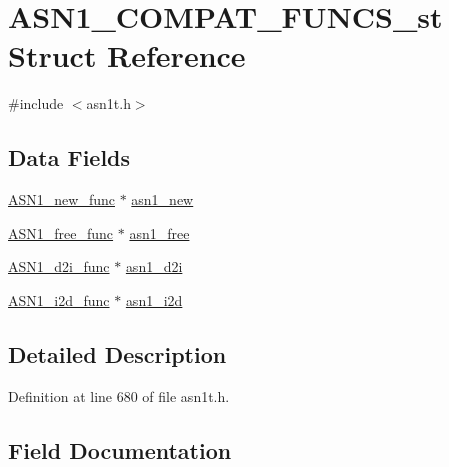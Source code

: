 \hypertarget{struct_a_s_n1___c_o_m_p_a_t___f_u_n_c_s__st}{}\section{A\+S\+N1\+\_\+\+C\+O\+M\+P\+A\+T\+\_\+\+F\+U\+N\+C\+S\+\_\+st Struct Reference}
\label{struct_a_s_n1___c_o_m_p_a_t___f_u_n_c_s__st}


{\ttfamily \#include $<$asn1t.\+h$>$}

\subsection*{Data Fields}
\begin{DoxyCompactItemize}
\item 
\hyperlink{include_2openssl_2asn1t_8h_a696ae7e8588980942989681270ec8244}{A\+S\+N1\+\_\+new\+\_\+func} $\ast$ \hyperlink{struct_a_s_n1___c_o_m_p_a_t___f_u_n_c_s__st_a9efd57d8ea8f2f3895114cb871ea1cae}{asn1\+\_\+new}
\item 
\hyperlink{include_2openssl_2asn1t_8h_ae84e006be7de18d7b22b41234df98f7e}{A\+S\+N1\+\_\+free\+\_\+func} $\ast$ \hyperlink{struct_a_s_n1___c_o_m_p_a_t___f_u_n_c_s__st_aa03372ac74e117577255fa280a82d08b}{asn1\+\_\+free}
\item 
\hyperlink{include_2openssl_2asn1t_8h_a560e54cc16622ea072a23306828eaf2a}{A\+S\+N1\+\_\+d2i\+\_\+func} $\ast$ \hyperlink{struct_a_s_n1___c_o_m_p_a_t___f_u_n_c_s__st_a13ccc6bc84e7b3a7ea23b53f9d097d48}{asn1\+\_\+d2i}
\item 
\hyperlink{include_2openssl_2asn1t_8h_a851672d2447ec1a37c86990ade25c140}{A\+S\+N1\+\_\+i2d\+\_\+func} $\ast$ \hyperlink{struct_a_s_n1___c_o_m_p_a_t___f_u_n_c_s__st_a4f09cb1cb676925b22d2408d6a96f781}{asn1\+\_\+i2d}
\end{DoxyCompactItemize}


\subsection{Detailed Description}


Definition at line 680 of file asn1t.\+h.



\subsection{Field Documentation}
